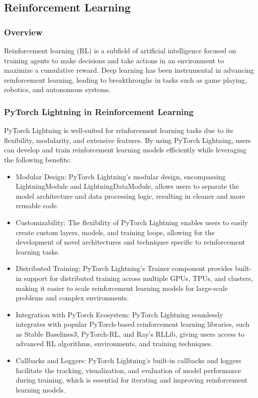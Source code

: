 \documentclass[12pt]{article}
\begin{document}
\subsection{Reinforcement Learning}

\subsubsection{Overview}

Reinforcement learning (RL) is a subfield of artificial intelligence focused on training agents to make decisions and take actions in an environment to maximize a cumulative reward. Deep learning has been instrumental in advancing reinforcement learning, leading to breakthroughs in tasks such as game playing, robotics, and autonomous systems.

\subsubsection{PyTorch Lightning in Reinforcement Learning}

PyTorch Lightning is well-suited for reinforcement learning tasks due to its flexibility, modularity, and extensive features. By using PyTorch Lightning, users can develop and train reinforcement learning models efficiently while leveraging the following benefits:

\begin{itemize}
    \item Modular Design: PyTorch Lightning's modular design, encompassing LightningModule and LightningDataModule, allows users to separate the model architecture and data processing logic, resulting in cleaner and more reusable code.
    \item Customizability: The flexibility of PyTorch Lightning enables users to easily create custom layers, models, and training loops, allowing for the development of novel architectures and techniques specific to reinforcement learning tasks.
    \item Distributed Training: PyTorch Lightning's Trainer component provides built-in support for distributed training across multiple GPUs, TPUs, and clusters, making it easier to scale reinforcement learning models for large-scale problems and complex environments.
    \item Integration with PyTorch Ecosystem: PyTorch Lightning seamlessly integrates with popular PyTorch-based reinforcement learning libraries, such as Stable Baselines3, PyTorch-RL, and Ray's RLLib, giving users access to advanced RL algorithms, environments, and training techniques.
    \item Callbacks and Loggers: PyTorch Lightning's built-in callbacks and loggers facilitate the tracking, visualization, and evaluation of model performance during training, which is essential for iterating and improving reinforcement learning models.
\end{itemize}
\end{document}
